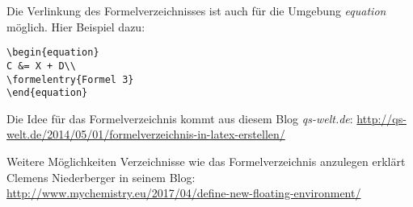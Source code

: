 Die Verlinkung des Formelverzeichnisses ist auch für die Umgebung \emph{equation} möglich. Hier Beispiel dazu: 

\begin{lstlisting}[style=LaTeX]
\begin{equation}
C &= X + D\\
\formelentry{Formel 3}
\end{equation}
\end{lstlisting}

Die Idee für das Formelverzeichnis kommt aus diesem Blog \emph{qs-welt.de}:
\url{http://qs-welt.de/2014/05/01/formelverzeichnis-in-latex-erstellen/}

Weitere Möglichkeiten Verzeichnisse wie das Formelverzeichnis anzulegen erklärt Clemens Niederberger in seinem Blog: \url{http://www.mychemistry.eu/2017/04/define-new-floating-environment/}
